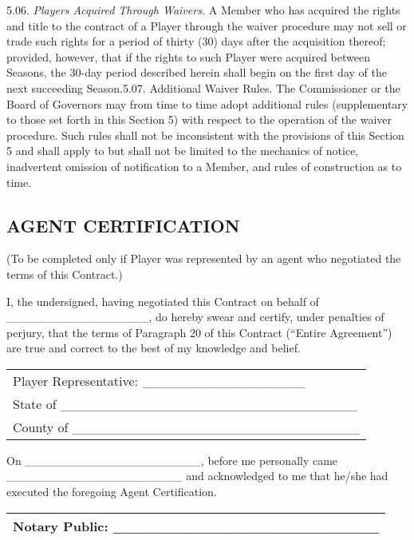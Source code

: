 \documentclass[
]{book}
\begin{document}
5.06. \emph{Players Acquired Through Waivers.} A Member who has acquired the rights and title to the contract of a Player through the waiver procedure may not sell or trade such rights for a period of thirty (30) days after the acquisition thereof; provided, however, that if the rights to such Player were acquired between Seasons, the 30-day period described herein shall begin on the first day of the next succeeding Season.5.07. Additional Waiver Rules. The Commissioner or the Board of Governors may from time to time adopt additional rules (supplementary to those set forth in this Section 5) with respect to the operation of the waiver procedure. Such rules shall not be inconsistent with the provisions of this Section 5 and shall apply to but shall not be limited to the mechanics of notice, inadvertent omission of notification to a Member, and rules of construction as to time.

\newpage

\hypertarget{agent-certification}{%
\subsection{AGENT CERTIFICATION}\label{agent-certification}}

(To be completed only if Player was represented by an agent who negotiated the terms of this Contract.)

I, the undersigned, having negotiated this Contract on behalf of \_\_\_\_\_\_\_\_\_\_\_\_\_\_\_\_\_, do hereby swear and certify, under penalties of perjury, that the terms of Paragraph 20 of this Contract (``Entire Agreement'') are true and correct to the best of my knowledge and belief.

\begin{longtable}[]{@{}l@{}}
\toprule()
\endhead
Player Representative: \_\_\_\_\_\_\_\_\_\_\_\_\_\_\_\_\_ \\
State of \_\_\_\_\_\_\_\_\_\_\_\_\_\_\_\_\_\_\_\_\_\_\_\_\_\_\_\_\_\_\_ \\
County of \_\_\_\_\_\_\_\_\_\_\_\_\_\_\_\_\_\_\_\_\_\_\_\_\_\_\_\_\_\_ \\
\bottomrule()
\end{longtable}

On \_\_\_\_\_\_\_\_\_\_\_\_\_\_\_\_\_\_\_\_\_, before me personally came \_\_\_\_\_\_\_\_\_\_\_\_\_\_\_\_\_\_\_\_\_ and acknowledged to me that he/she had executed the foregoing Agent Certification.

\begin{longtable}[]{@{}l@{}}
\toprule()
\endhead
Notary Public: \_\_\_\_\_\_\_\_\_\_\_\_\_\_\_\_\_\_\_\_\_\_\_\_ \\
\bottomrule()
\end{longtable}
\end{document}
